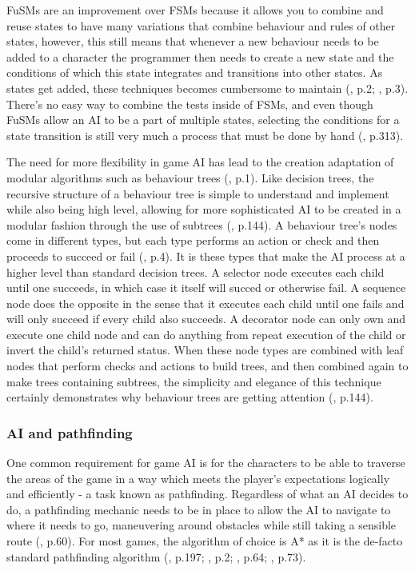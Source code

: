 \documentclass[11pt, a4paper]{article}
\begin{document}
FuSMs are an improvement over FSMs because it allows you to combine and reuse states to have many variations that combine behaviour and rules of other states, however, this still means that whenever a new behaviour needs to be added to a character the programmer then needs to create a new state and the conditions of which this state integrates and transitions into other states. As states get added, these techniques becomes cumbersome to maintain (\cite{sweetser2002current}, p.2; \cite{lim2010evolving}, p.3). There's no easy way to combine the tests inside of FSMs, and even though FuSMs allow an AI to be a part of multiple states, selecting the conditions for a state transition is still very much a process that must be done by hand (\cite{millington2019ai}, p.313). 

The need for more flexibility in game AI has lead to the creation adaptation of modular algorithms such as behaviour trees (\cite{lim2010evolving}, p.1). Like decision trees, the recursive structure of a behaviour tree is simple to understand and implement while also being high level, allowing for more sophisticated AI to be created in a modular fashion through the use of subtrees (\cite{shoulson2011parameterizing}, p.144). A behaviour tree's nodes come in different types, but each type performs an action or check and then proceeds to succeed or fail (\cite{lim2010evolving}, p.4). It is these types that make the AI process at a higher level than standard decision trees. A selector node executes each child until one succeeds, in which case it itself will succed or otherwise fail. A sequence node does the opposite in the sense that it executes each child until one fails and will only succeed if every child also succeeds. A decorator node can only own and execute one child node and can do anything from repeat execution of the child or invert the child's returned status. When these node types are combined with leaf nodes that perform checks and actions to build trees, and then combined again to make trees containing subtrees, the simplicity and elegance of this technique certainly demonstrates why behaviour trees are getting attention (\cite{shoulson2011parameterizing}, p.144).

\subsubsection{AI and pathfinding}

One common requirement for game AI is for the characters to be able to traverse the areas of the game in a way which meets the player's expectations logically and efficiently - a task known as pathfinding. Regardless of what an AI decides to do, a pathfinding mechanic needs to be in place to allow the AI to navigate to where it needs to go, maneuvering around obstacles while still taking a sensible route (\cite{graham2003pathfinding}, p.60). For most games, the algorithm of choice is A* as it is the de-facto standard pathfinding algorithm (\cite{millington2019ai}, p.197; \cite{botea2004near}, p.2; \cite{nareyek2004ai}, p.64; \cite{leigh2007using}, p.73).
\end{document}
